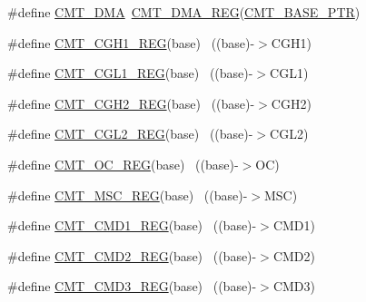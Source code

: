 \begin{DoxyCompactItemize}
\item 
\#define \hyperlink{group___c_m_t___register___accessor___macros_gadaf0785d5239674d6b363584b8d44c4c}{C\+M\+T\+\_\+\+D\+MA}~\hyperlink{group___c_m_t___register___accessor___macros_gaa749274da5a6a51144a4423bed217248}{C\+M\+T\+\_\+\+D\+M\+A\+\_\+\+R\+EG}(\hyperlink{group___c_m_t___peripheral_gae361f199741d5276c4618edb9ee289b7}{C\+M\+T\+\_\+\+B\+A\+S\+E\+\_\+\+P\+TR})
\item 
\#define \hyperlink{group___c_m_t___register___accessor___macros_ga1f00c7e08c77c8d2388cc2f0f819d187}{C\+M\+T\+\_\+\+C\+G\+H1\+\_\+\+R\+EG}(base)                                          ~((base)-\/$>$C\+G\+H1)
\item 
\#define \hyperlink{group___c_m_t___register___accessor___macros_ga771dd48290399c3c4f3b104299e28f66}{C\+M\+T\+\_\+\+C\+G\+L1\+\_\+\+R\+EG}(base)                                          ~((base)-\/$>$C\+G\+L1)
\item 
\#define \hyperlink{group___c_m_t___register___accessor___macros_ga8aeb87a39cf6d86e317a6ddb8340e8fa}{C\+M\+T\+\_\+\+C\+G\+H2\+\_\+\+R\+EG}(base)                                          ~((base)-\/$>$C\+G\+H2)
\item 
\#define \hyperlink{group___c_m_t___register___accessor___macros_gac1baf38413e70d4e3077963d08d67c1a}{C\+M\+T\+\_\+\+C\+G\+L2\+\_\+\+R\+EG}(base)                                          ~((base)-\/$>$C\+G\+L2)
\item 
\#define \hyperlink{group___c_m_t___register___accessor___macros_ga2b29abafd53b2d21c63ac04ca73c8ab3}{C\+M\+T\+\_\+\+O\+C\+\_\+\+R\+EG}(base)                                              ~((base)-\/$>$OC)
\item 
\#define \hyperlink{group___c_m_t___register___accessor___macros_ga8b8f43bd61d3d9b918c86cc17e530a23}{C\+M\+T\+\_\+\+M\+S\+C\+\_\+\+R\+EG}(base)                                            ~((base)-\/$>$M\+SC)
\item 
\#define \hyperlink{group___c_m_t___register___accessor___macros_gaf70e5f0b96785634416451b252de9522}{C\+M\+T\+\_\+\+C\+M\+D1\+\_\+\+R\+EG}(base)                                          ~((base)-\/$>$C\+M\+D1)
\item 
\#define \hyperlink{group___c_m_t___register___accessor___macros_ga52cac578885360a51fb5f8333a32499f}{C\+M\+T\+\_\+\+C\+M\+D2\+\_\+\+R\+EG}(base)                                          ~((base)-\/$>$C\+M\+D2)
\item 
\#define \hyperlink{group___c_m_t___register___accessor___macros_gae48de2fa2e70ed138d31e8369dfa5a3a}{C\+M\+T\+\_\+\+C\+M\+D3\+\_\+\+R\+EG}(base)                                          ~((base)-\/$>$C\+M\+D3)

\end{DoxyCompactItemize}
